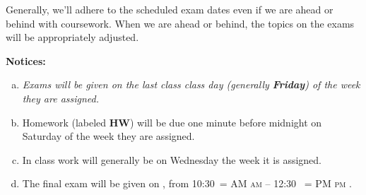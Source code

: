 \documentclass[12pt]{article}
\makeatletter
\newcounter{ex}\setcounter{ex}{0}
\newenvironment{alphalist}{
  \begin{enumerate}[(a)]
    \addtolength{\itemsep}{-0.5\itemsep}}
  {\end{enumerate}}
\DeclareRobustCommand{\maybefakesc}[1]{%
  \ifnum\pdfstrcmp{\f@series}{\bfdefault}=\z@
    {\fontsize{\dimexpr0.8\dimexpr\f@size pt\relax}{0}\selectfont\uppercase{#1}}%
  \else
    \textsc{#1}%
  \fi
}
\newcommand\AM{\,\maybefakesc{am}\xspace}
\newcommand\PM{\,\maybefakesc{pm}\xspace}
\newcommand{\finaldateandtime}{\printdate{15/12/\the\year},{} from 10:30\AM{} -- 12:30 \PM}
\makeatother
\begin{document}
Generally, we'll adhere to the scheduled exam dates even if we are ahead or behind with coursework.  
When we are ahead or behind, the topics on the exams will be appropriately adjusted.  



\noindent \textbf{Notices:}


\begin{alphalist}
   \item \emph{Exams will be given on  the last class class day (generally \textbf{Friday})  of the week they are assigned.}
   

    \item Homework (labeled \textbf{HW}) will be due one minute before midnight on  Saturday of the week they are assigned.  

    \item In class work will generally  be on Wednesday the week it is assigned.  
    
    \item The final exam will be given on \finaldateandtime.
    
\end{alphalist}
\end{document}
